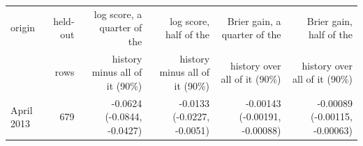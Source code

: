 \begin{tabular}{lrrrrr}
\toprule
origin & held-out & log score, a quarter of the & log score, half of the & Brier gain, a quarter of the & Brier gain, half of the \\
 & rows & history minus all of it (90\%) & history minus all of it (90\%) & history over all of it (90\%) & history over all of it (90\%) \\
\midrule
April 2013 & 679 & -0.0624 (-0.0844, -0.0427) & -0.0133 (-0.0227, -0.0051) & -0.00143 (-0.00191, -0.00088) & -0.00089 (-0.00115, -0.00063) \\

\end{tabular}
